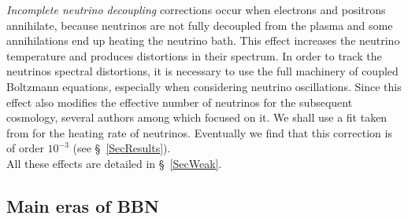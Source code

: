 \documentclass[onecolumn,float,floatfix,preprintnumbers,aps,rmp,nofootinbib,amsmath,amssymb,amsfonts,superscriptaddress,tightenlines]{revtex4}
\newcommand{\YPfour}{Y_{\rm P}^{(4)}}
\begin{document}
{\it Incomplete neutrino decoupling} corrections occur when electrons
and positrons annihilate, because neutrinos are not fully  decoupled
from the plasma and some annihilations end up heating the neutrino
bath. This effect increases the neutrino temperature and produces
distortions in their spectrum. In order to track the neutrinos
spectral distortions, it is necessary to use the full machinery of
coupled Boltzmann equations, especially when considering neutrino
oscillations. Since this effect also modifies the effective number of
neutrinos for the subsequent cosmology, several authors among which
\citet{Dolgov1997,Mangano2005,Grohs:2015tfy,deSalas:2016ztq} focused
on it. We shall use a fit taken from \citet{Parthenope} for the heating rate of
  neutrinos. Eventually we find that this correction is of order $10^{-3}$ (see \S~\ref{SecResults}).\\%

All these effects are detailed in \S~\ref{SecWeak}.


\subsection{Main eras of BBN}
\end{document}
